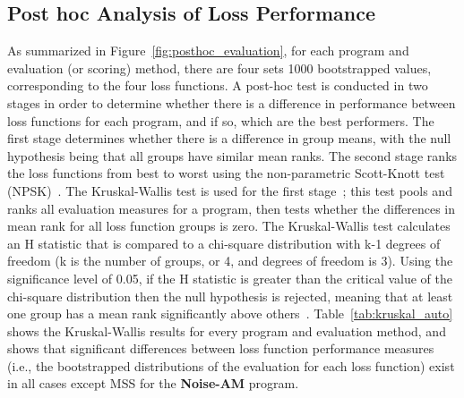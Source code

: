 \documentclass[lettersize,journal]{IEEEtran}
\providecommand{\gls}[1]{#1}
\newcommand{\AmpMod}{\textbf{Noise-AM}}
\begin{document}
\subsection{Post hoc Analysis of Loss Performance}
\label{sec:results_posthoc}
As summarized in Figure~\ref{fig:posthoc_evaluation}, for each program and evaluation (or scoring) method, there are four sets 1000 bootstrapped values, corresponding to the four loss functions. A post-hoc test is conducted in two stages in order to determine whether there is a difference in performance between loss functions for each program, and if so, which are the best performers. The first stage determines whether there is a difference in group means, with the null hypothesis being that all groups have similar mean ranks. The second stage ranks the loss functions from best to worst using the non-parametric Scott-Knott test (\gls{NPSK})~\cite{tantithamthavorn2017mvt,tantithamthavorn2018optimization}.
The Kruskal-Wallis test is used for the first stage~\cite{kruskal1952use}; this test pools and ranks all evaluation measures for a program, then tests whether the differences in mean rank for all loss function groups is zero. The Kruskal-Wallis test calculates an H statistic that is compared to a chi-square distribution with k-1 degrees of freedom (k is the number of groups, or 4, and degrees of freedom is 3). Using the significance level of 0.05, if the H statistic is greater than the critical value of the chi-square distribution then the null hypothesis is rejected, meaning that at least one group has a mean rank significantly above others~\cite{kruskal1952use}. Table~\ref{tab:kruskal_auto} shows the Kruskal-Wallis results for every program and evaluation method, and shows that significant differences between loss function performance measures (i.e., the bootstrapped distributions of the evaluation for each loss function) exist in all cases except MSS for the \AmpMod{} program. 
\end{document}

